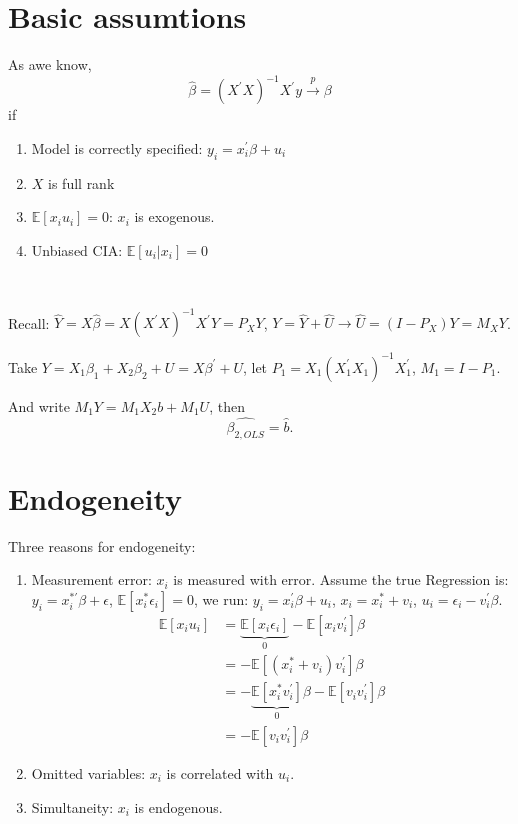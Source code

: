 \section{Basic assumtions}
\label{sec:basic-assumtions}

As awe know, \[
    \hat{\beta} = (X^{\prime} X)^{-1}X^{\prime} y \overset{p}{\to} \beta
\]
if
\begin{enumerate}
    \item Model is correctly specified: $y_i = x_i^{\prime} \beta + u_i$
    \item $X$ is full rank
    \item $\mathbb{E}[x_i u_i] = 0$: $x_i$ is exogenous.
    \item Unbiased CIA: $\mathbb{E}[u_i|x_i] = 0$
\end{enumerate}

\begin{theorem}
    \label{thm:FWL}
    \ 

    Recall: $\hat{Y} = X \hat{\beta} = X(X^{\prime} X)^{-1}X^{\prime} Y = P_X Y$, $Y = \hat{Y} + \hat{U} \rightarrow \hat{U} = (I - P_X)Y = M_X Y$.

    Take $Y = X_1 \beta_1 + X_2 \beta_2 + U = X \beta ^{\prime} +U$,
    let $P_1 = X_1 (X_1^{\prime} X_1)^{-1}X_1^{\prime} $, $M_1 = I - P_1$.

    And write $M_1 Y = M_1 X_2 b + M_1 U$, then
    \[\hat{\beta_{2, OLS}} = \hat{b}.\]
\end{theorem}

\section{Endogeneity}
\label{sec:endogeneity}

Three reasons for endogeneity:
\begin{enumerate}
    \item Measurement error: $x_i$ is measured with error.
        Assume the true Regression is: $y_i = x_i^{* \prime} \beta +\epsilon$, $\mathbb{E}[x_i^* \epsilon_i] = 0$,
        we run: $y_i = x_i^{\prime} \beta +u_i$, $x_i = x_i^* + v_i$, $u_i = \epsilon_i - v_i^{\prime} \beta$.
        \begin{align*}
            \mathbb{E}[x_i u_i] &= \underset{0}{\underbrace{\mathbb{E}[x_i \epsilon_i]}} - \mathbb{E}[x_i v_i^{\prime} ]\beta \\
            &= -\mathbb{E}[(x_i^* + v_i) v_i^{\prime} ]\beta \\
            &= -\underset{0}{\underbrace{\mathbb{E}[x_i^* v_i^{\prime}]}}\beta - \mathbb{E}[v_i v_i^{\prime} ]\beta \\
            &= - \mathbb{E}[v_i v_i^{\prime} ]\beta
        \end{align*}
    \item Omitted variables: $x_i$ is correlated with $u_i$.
    \item Simultaneity: $x_i$ is endogenous.
\end{enumerate}

